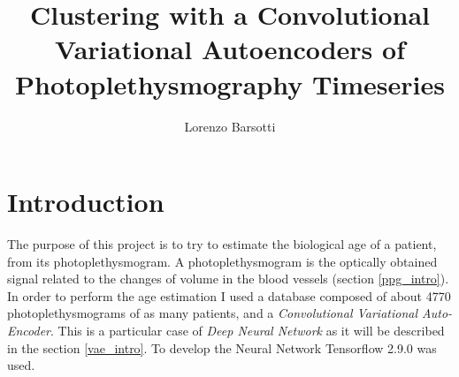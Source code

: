 \documentclass[12pt,a4paper,twocolumn]{article}
\title{Clustering with a Convolutional Variational Autoencoders of Photoplethysmography Timeseries}
\author{Lorenzo Barsotti}
\begin{document}
 \thispagestyle{empty}
	

	\section{Introduction}
		The purpose of this project is to try to estimate the biological age of a patient, from its photoplethysmogram. A photoplethysmogram is the optically obtained signal related to the changes of volume in the blood vessels (section \ref{ppg_intro}). In order to perform the age estimation I used a database composed of about 4770 photoplethysmograms of as many patients, and a \emph{Convolutional Variational Auto-Encoder}. This is a particular case of \emph{Deep Neural Network} as it will be described in the section \ref{vae_intro}. To develop the Neural Network Tensorflow 2.9.0 \cite{tensorflow2015-whitepaper} was used.
\end{document}
